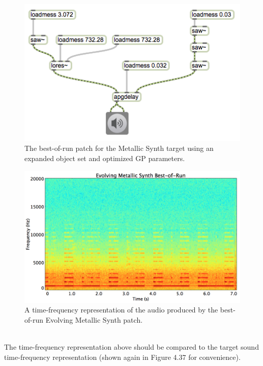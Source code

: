 \documentclass[a4paper,12pt]{report} 	%
\numberwithin{figure}{chapter}
\numberwithin{table}{chapter}
\numberwithin{equation}{chapter}
\begin{document}
\begin{flushleft}
\begin{figure}[h!]
\begin{center}
\includegraphics[width=\linewidth]{MetallicSynth_Best}
\caption[Metallic Synth Best-of-Run Patch]{The best-of-run patch for the Metallic Synth target using an expanded object set and optimized GP parameters.}
\end{center}
\end{figure}
\begin{figure}[h!]
\begin{center}
\includegraphics[scale=0.35,width=\linewidth]{EvolvingMetallicSynthBestOfRun}
\caption[Best-of-Run Evolving Metallic Synth Time-Frequency Representation]{A time-frequency representation of the audio produced by the best-of-run Evolving Metallic Synth patch.}
\end{center}
\end{figure}
\\
The time-frequency representation above should be compared to the target sound time-frequency representation (shown again in Figure 4.37 for convenience).

\end{flushleft}
\end{document}
